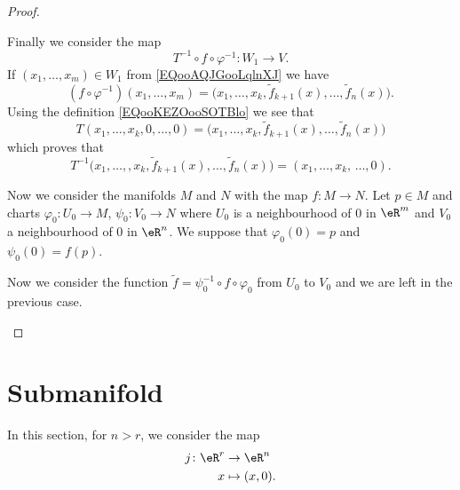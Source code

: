 \begin{proof}
\begin{subproof}
\begin{subproof}

			Finally we consider the map
			\begin{equation}
				T^{-1}\circ f\circ \varphi^{-1}\colon W_1 \to V.
			\end{equation}
			If \( (x_1,\ldots, x_m)\in W_1\) from \eqref{EQooAQJGooLqlnXJ} we have
			\begin{equation}
				(f\circ \varphi^{-1})(x_1,\ldots, x_m)=\big( x_1,\ldots, x_k,\tilde f_{k+1}(x),\ldots, \tilde f_n(x) \big).
			\end{equation}
			Using the definition \eqref{EQooKEZOooSOTBlo} we see that
			\begin{equation}
				T(x_1,\ldots, x_k,0,\ldots, 0)=\big( x_1,\ldots, x_k,\tilde f_{k+1}(x),\ldots, \tilde f_n(x) \big)
			\end{equation}
			which proves that
			\begin{equation}
				T^{-1}\big( x_1,\ldots, ,x_k,\tilde f_{k+1}(x),\ldots, \tilde f_n(x) \big)=(x_1,\ldots, x_k,\,\ldots, 0).
			\end{equation}
		\end{subproof}


		Now we consider the manifolds \( M\) and \( N\) with the map \( f\colon M\to N\). Let \( p\in M\) and charts \( \varphi_0\colon U_0\to M\), \( \psi_0\colon V_0\to N\) where \( U_0\) is a neighbourhood of \( 0\) in \( \eR^m\) and \( V_0\) a neighbourhood of \( 0\) in \( \eR^n\). We suppose that \( \varphi_0(0)=p\) and \( \psi_0(0)=f(p)\).

		Now we consider the function \( \tilde f=\psi_0^{-1}\circ f\circ \varphi_0\) from \( U_0\) to \( V_0\) and we are left in the previous case.
	\end{subproof}
\end{proof}


\section{Submanifold}

In this section, for \( n>r\), we consider the map
\begin{equation}
	\begin{aligned}
		j\colon \eR^r & \to \eR^n      \\
		x             & \mapsto (x,0).
	\end{aligned}
\end{equation}

